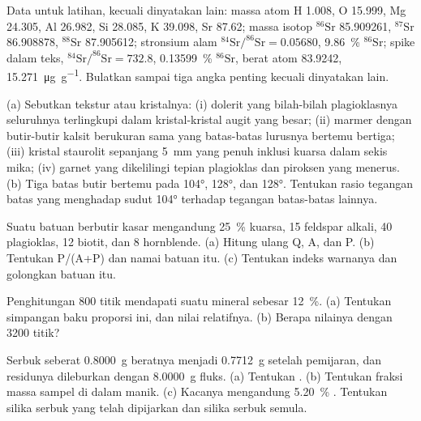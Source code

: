 Data untuk latihan, kecuali dinyatakan lain: massa atom H 1.008, O 15.999, Mg 24.305, Al
26.982, Si 28.085, K 39.098, Sr 87.62; massa isotop $^{86}\mathrm{Sr}$ 85.909261,
$^{87}\mathrm{Sr}$ 86.908878, $^{88}\mathrm{Sr}$ 87.905612; stronsium alam
$^{84}\mathrm{Sr}/^{86}\mathrm{Sr} = 0.05680$, \qty{9.86}{\percent} $^{86}\mathrm{Sr}$; spike
dalam teks, $^{84}\mathrm{Sr}/^{86}\mathrm{Sr} = 732.8$, \qty{0.13599}{\percent}
$^{86}\mathrm{Sr}$, berat atom 83.9242, \qty{15.271}{\micro\gram\per\gram}. Bulatkan sampai tiga
angka penting kecuali dinyatakan lain.

\begin{exercise}[$\star$]\label{exo:b2:field-lab-methods-2:1}
(a) Sebutkan tekstur atau kristalnya: (i) dolerit yang bilah-bilah plagioklasnya seluruhnya terlingkupi dalam
kristal-kristal augit yang besar; (ii) marmer dengan butir-butir kalsit berukuran sama yang batas-batas lurusnya bertemu
bertiga; (iii) kristal staurolit sepanjang \qty{5}{mm} yang penuh inklusi kuarsa dalam sekis mika;
(iv) garnet yang dikelilingi tepian plagioklas dan piroksen yang menerus. (b) Tiga batas butir
bertemu pada \ang{104}, \ang{128}, dan \ang{128}. Tentukan rasio tegangan batas yang menghadap
sudut \ang{104} terhadap tegangan batas-batas lainnya.
\end{exercise}

\begin{exercise}[$\star$]\label{exo:b2:field-lab-methods-2:2}
Suatu batuan berbutir kasar mengandung \qty{25}{\percent} kuarsa, 15 feldspar alkali, 40 plagioklas, 12
biotit, dan 8 hornblende. (a) Hitung ulang Q, A, dan P. (b) Tentukan P/(A+P) dan namai batuan itu. (c) Tentukan
indeks warnanya dan golongkan batuan itu.
\end{exercise}

\begin{exercise}[$\star$]\label{exo:b2:field-lab-methods-2:3}
Penghitungan 800 titik mendapati suatu mineral sebesar \qty{12}{\percent}. (a) Tentukan simpangan baku
proporsi ini, dan nilai relatifnya. (b) Berapa nilainya dengan 3200 titik?
\end{exercise}

\begin{exercise}[$\star$]\label{exo:b2:field-lab-methods-2:4}
Serbuk seberat \qty{0.8000}{g} beratnya menjadi \qty{0.7712}{g} setelah pemijaran, dan residunya dileburkan dengan
\qty{8.0000}{g} fluks. (a) Tentukan . (b) Tentukan fraksi massa sampel di dalam
manik. (c) Kacanya mengandung \qty{5.20}{\percent} . Tentukan silika serbuk yang telah dipijarkan
dan silika serbuk semula.
\end{exercise}

